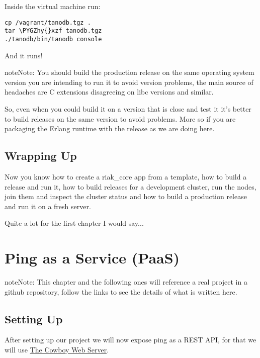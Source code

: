 \documentclass[letterpaper,10pt,english]{sphinxmanual}
\def\PYGZhy{\char`\-}
\begin{document}
Inside the virtual machine run:

\begin{Verbatim}[commandchars=\\\{\}]
cp /vagrant/tanodb.tgz .
tar \PYGZhy{}xzf tanodb.tgz
./tanodb/bin/tanodb console
\end{Verbatim}

And it runs!

\begin{notice}{note}{Note:}
You should build the production release on the same operating system
version you are intending to run it to avoid version problems, the
main source of headaches are C extensions disagreeing on libc versions
and similar.

So, even when you could build it on a version that is close and test
it it's better to build releases on the same version to avoid
problems. More so if you are packaging the Erlang runtime with the
release as we are doing here.
\end{notice}


\section{Wrapping Up}
\label{starting:wrapping-up}
Now you know how to create a riak\_core app from a template, how to build a
release and run it, how to build releases for a development cluster, run
the nodes, join them and inspect the cluster status and how to build a
production release and run it on a fresh server.

Quite a lot for the first chapter I would say...


\chapter{Ping as a Service (PaaS)}
\label{ping-as-a-service::doc}\label{ping-as-a-service:ping-as-a-service-paas}
\begin{notice}{note}{Note:}
This chapter and the following ones will reference a real project in a
github repository, follow the links to see the details of what is written
here.
\end{notice}


\section{Setting Up}
\label{ping-as-a-service:setting-up}
After setting up our project we will now expose ping as a REST API, for that
we will use \href{http://ninenines.eu/docs/en/cowboy/1.0/}{The Cowboy Web Server}.
\end{document}
